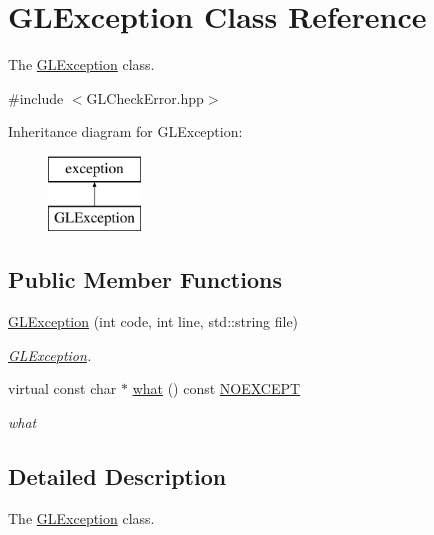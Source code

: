 \hypertarget{class_g_l_exception}{\section{G\-L\-Exception Class Reference}
\label{class_g_l_exception}
}


The \hyperlink{class_g_l_exception}{G\-L\-Exception} class.  




{\ttfamily \#include $<$G\-L\-Check\-Error.\-hpp$>$}

Inheritance diagram for G\-L\-Exception\-:\begin{figure}[H]
\begin{center}
\leavevmode
\includegraphics[height=2.000000cm]{class_g_l_exception}
\end{center}
\end{figure}
\subsection*{Public Member Functions}
\begin{DoxyCompactItemize}
\item 
\hyperlink{class_g_l_exception_a4e89f3cf9f4111c5ff27f1b4a04cbc44}{G\-L\-Exception} (int code, int line, std\-::string file)
\begin{DoxyCompactList}\small\item\em \hyperlink{class_g_l_exception}{G\-L\-Exception}. \end{DoxyCompactList}\item 
virtual const char $\ast$ \hyperlink{class_g_l_exception_adb5040f64f34f6c86e6019b0d8d65c78}{what} () const \hyperlink{_g_l_check_error_8hpp_a10a59554805ac7ce3905fd3540f98137}{N\-O\-E\-X\-C\-E\-P\-T}
\begin{DoxyCompactList}\small\item\em what \end{DoxyCompactList}\end{DoxyCompactItemize}


\subsection{Detailed Description}
The \hyperlink{class_g_l_exception}{G\-L\-Exception} class. 

